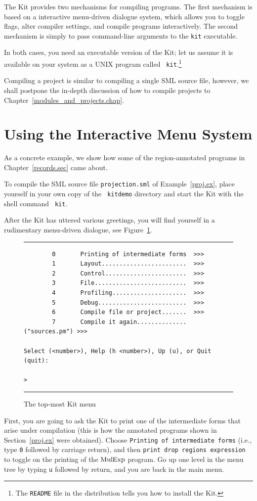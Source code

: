 \documentclass[12pt]{book}
\begin{document}
The Kit provides two mechanisms for compiling programs. The first
mechanism is based on a
%
interactive menu-driven dialogue system, which allows you to toggle
flags, alter compiler settings, and compile programs interactively.
The second mechanism is simply to pass command-line arguments to the
{\tt kit} executable.

In both cases, you need an executable version of the Kit; let us
assume it is available on your system as a UNIX program called {\tt
  kit}.\footnote{The {\tt README} file in the distribution tells you
  how to install the Kit.}

Compiling a project is similar to compiling a single SML source file,
however, we shall postpone the in-depth discussion of how to compile
projects to Chapter~\ref{modules_and_projects.chap}.

\section{Using the Interactive Menu System}

As a concrete example, we show how some of the region-annotated
programs in Chapter~\ref{records.sec} came about.

To compile the SML source file {\tt projection.sml} of
Example~\ref{proj.ex}, place yourself in your own copy of the {\tt
  kitdemo} directory and start the Kit with the shell command {\tt
  kit}.

After the Kit has uttered various greetings, you will find yourself in
a rudimentary menu-driven dialogue, see Figure~\ref{dialogue.fig}.
\begin{figure}
\hrule \medskip
\begin{verbatim}
        0       Printing of intermediate forms  >>>
        1       Layout........................  >>>
        2       Control.......................  >>>
        3       File..........................  >>>
        4       Profiling.....................  >>>
        5       Debug.........................  >>>
        6       Compile file or project.......  >>>
        7       Compile it again.............. ("sources.pm") >>>

Select (<number>), Help (h <number>), Up (u), or Quit (quit): 

>
\end{verbatim}
\caption{The top-most Kit menu}
\medskip \hrule 
\label{dialogue.fig}
\end{figure}
First, you are going to ask the Kit to print one of the intermediate
forms that arise under compilation (this is how the annotated programs
shown in  Section~\ref{proj.ex} were obtained). 
Choose \texttt{Printing of intermediate forms} (i.e., type \texttt{0}
followed by carriage return), and then \texttt{print drop regions
expression} to toggle on the printing of the $\hbox{\rm MulExp}$ program.
Go up one level in the menu tree by typing \texttt{u} followed by return,
and you are back in the main menu.
\end{document}
